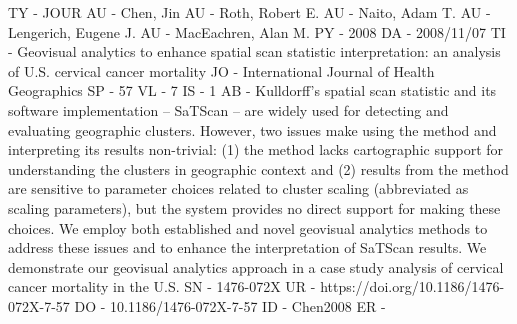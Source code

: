 TY  - JOUR
AU  - Chen, Jin
AU  - Roth, Robert E.
AU  - Naito, Adam T.
AU  - Lengerich, Eugene J.
AU  - MacEachren, Alan M.
PY  - 2008
DA  - 2008/11/07
TI  - Geovisual analytics to enhance spatial scan statistic interpretation: an analysis of U.S. cervical cancer mortality
JO  - International Journal of Health Geographics
SP  - 57
VL  - 7
IS  - 1
AB  - Kulldorff's spatial scan statistic and its software implementation – SaTScan – are widely used for detecting and evaluating geographic clusters. However, two issues make using the method and interpreting its results non-trivial: (1) the method lacks cartographic support for understanding the clusters in geographic context and (2) results from the method are sensitive to parameter choices related to cluster scaling (abbreviated as scaling parameters), but the system provides no direct support for making these choices. We employ both established and novel geovisual analytics methods to address these issues and to enhance the interpretation of SaTScan results. We demonstrate our geovisual analytics approach in a case study analysis of cervical cancer mortality in the U.S.
SN  - 1476-072X
UR  - https://doi.org/10.1186/1476-072X-7-57
DO  - 10.1186/1476-072X-7-57
ID  - Chen2008
ER  - 
